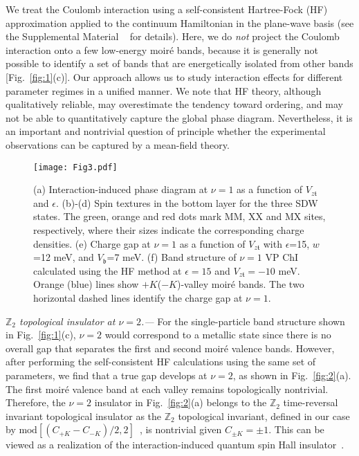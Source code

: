 \documentclass[aps,prl,twocolumn,superscriptaddress,longbibliography]{revtex4-2}
\begin{document}
We treat the Coulomb interaction using a self-consistent Hartree-Fock (HF) approximation applied to the continuum Hamiltonian in the plane-wave basis (see the Supplemental Material ~\cite{HeteroBilayer_SM} for details). Here, we do {\it not} project the Coulomb interaction onto a few low-energy moir\'e bands, because it is generally not possible to identify a set of bands that are energetically isolated from other bands [Fig.~\ref{fig:1}(c)]. Our approach allows us to study interaction effects for different parameter regimes in a unified manner. We note that HF theory, although qualitatively reliable, may overestimate the tendency toward ordering, and may not be able to quantitatively capture the global phase diagram. Nevertheless, it is an important and nontrivial question of principle whether the experimental observations can be captured by a mean-field theory. 

\begin{figure}[t]
    \centering
    \texttt{[image: Fig3.pdf]}
    \caption{(a) Interaction-induced phase diagram at $\nu=1$ as a function of $V_{z\mathfrak{t}}$ and $\epsilon$.  (b)-(d) Spin textures in the bottom layer for the three SDW states. The green, orange and red dots mark MM, XX and {MX} sites, respectively, {where their sizes indicate the corresponding charge densities.} (e)  Charge gap at $\nu=1$ as a function of $V_{z\mathfrak{t}}$ with $\epsilon$=15, $w$=12 meV, and $V_\mathfrak{b}$=7 meV. (f) Band structure of $\nu=1$ VP ChI calculated using the HF method at $\epsilon=15$ and $V_{z\mathfrak{t}}=-10$ meV. Orange (blue) lines show $+K$($-K$)-valley moir\'e bands. {The two horizontal dashed lines identify the charge gap at $\nu=1$.}
        }
    \label{fig:3}
\end{figure}


\textit{$\mathbb{Z}_2$ topological insulator at $\nu=2$.---}
For the single-particle band structure shown in Fig.~\ref{fig:1}(c), $\nu=2$ would correspond to a metallic state since there is no overall gap that separates the first and second moir\'e valence bands. However, after performing the self-consistent HF calculations using the same set of parameters, we find that a true gap develops at $\nu=2$, as shown in  Fig.~\ref{fig:2}(a).  The first moir\'e valence band at each valley remains topologically nontrivial. Therefore, the $\nu=2$ insulator in  Fig.~\ref{fig:2}(a) belongs to
the $\mathbb{Z}_2$ time-reversal invariant topological insulator as the $\mathbb{Z}_2$ topological invariant, defined in our case by $\text{mod}[(C_{+K}-C_{-K})/2,2]$~\cite{kane2005quantum}, is nontrivial given $C_{\pm K}=\pm 1$. This can be viewed as a realization of the interaction-induced quantum spin Hall insulator~\cite{kane2005quantum}.
\end{document}
